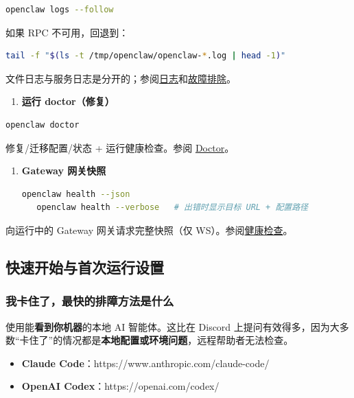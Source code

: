 \begin{lstlisting}[language=bash]
   openclaw logs --follow
\end{lstlisting}


如果 RPC 不可用，回退到：

\begin{lstlisting}[language=bash]
   tail -f "$(ls -t /tmp/openclaw/openclaw-*.log | head -1)"
\end{lstlisting}


文件日志与服务日志是分开的；参阅\href{/logging}{日志}和\href{/gateway/troubleshooting}{故障排除}。

\begin{enumerate}
  \item \textbf{运行 doctor（修复）}
\end{enumerate}


\begin{lstlisting}[language=bash]
   openclaw doctor
\end{lstlisting}


修复/迁移配置/状态 + 运行健康检查。参阅 \href{/gateway/doctor}{Doctor}。

\begin{enumerate}
  \item \textbf{Gateway 网关快照}
\begin{lstlisting}[language=bash]
   openclaw health --json
   openclaw health --verbose   # 出错时显示目标 URL + 配置路径
\end{lstlisting}

\end{enumerate}

向运行中的 Gateway 网关请求完整快照（仅 WS）。参阅\href{/gateway/health}{健康检查}。

\subsection{快速开始与首次运行设置}


\subsubsection{我卡住了，最快的排障方法是什么}


使用能\textbf{看到你机器}的本地 AI 智能体。这比在 Discord 上提问有效得多，因为大多数“卡住了”的情况都是\textbf{本地配置或环境问题}，远程帮助者无法检查。

\begin{itemize}
  \item \textbf{Claude Code}：https://www.anthropic.com/claude-code/
  \item \textbf{OpenAI Codex}：https://openai.com/codex/
\end{itemize}


